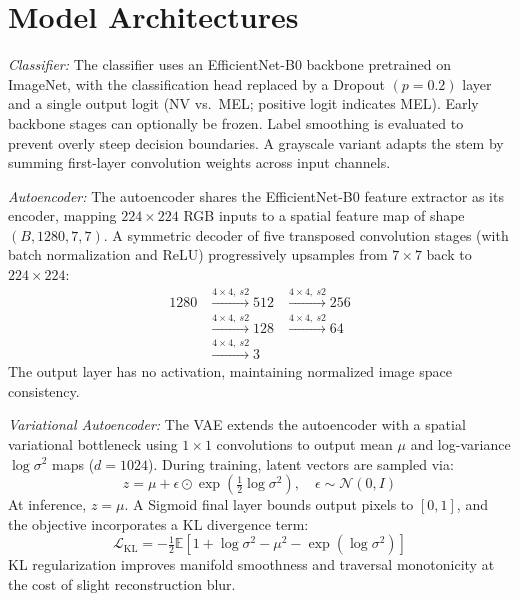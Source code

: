 \documentclass[conference,compsoc]{IEEEtran}
\begin{document}
\section{Model Architectures}

\noindent \textit{Classifier:}
The classifier uses an EfficientNet-B0 \cite{efficientnet} backbone pretrained on ImageNet, with the classification head replaced by a Dropout $(p{=}0.2)$ layer and a single output logit (NV vs.\ MEL; positive logit indicates MEL). Early backbone stages can optionally be frozen. Label smoothing is evaluated to prevent overly steep decision boundaries. A grayscale variant adapts the stem by summing first-layer convolution weights across input channels.

\noindent \textit{Autoencoder:}
The autoencoder shares the EfficientNet-B0 feature extractor as its encoder, mapping $224 \times 224$ RGB inputs to a spatial feature map of shape $(B, 1280, 7, 7)$. A symmetric decoder of five transposed convolution stages (with batch normalization and ReLU) progressively upsamples from $7 \times 7$ back to $224 \times 224$:
\begin{equation}
\begin{aligned}
1280 &\xrightarrow{4 \times 4,\ s2} 512 
     &\xrightarrow{4 \times 4,\ s2} 256 \\
     &\xrightarrow{4 \times 4,\ s2} 128 
     &\xrightarrow{4 \times 4,\ s2} 64 \\
     &\xrightarrow{4 \times 4,\ s2} 3
\end{aligned}
\end{equation}
The output layer has no activation, maintaining normalized image space consistency.

\noindent \textit{Variational Autoencoder:}
The VAE extends the autoencoder with a spatial variational bottleneck using $1 \times 1$ convolutions to output mean $\mu$ and log-variance $\log \sigma^2$ maps ($d = 1024$). During training, latent vectors are sampled via:
\begin{equation}
   z = \mu + \epsilon \odot \exp\!\left(\tfrac{1}{2} \log \sigma^2\right), \quad \epsilon \sim \mathcal{N}(0, I) 
\end{equation}
At inference, $z = \mu$. A Sigmoid final layer bounds output pixels to $[0, 1]$, and the objective incorporates a KL divergence term:
\begin{equation}
    \mathcal{L}_{\text{KL}} = -\tfrac{1}{2} \mathbb{E}\!\left[1 + \log \sigma^2 - \mu^2 - \exp(\log \sigma^2)\right]
\end{equation}
KL regularization improves manifold smoothness and traversal monotonicity at the cost of slight reconstruction blur.
\end{document}
